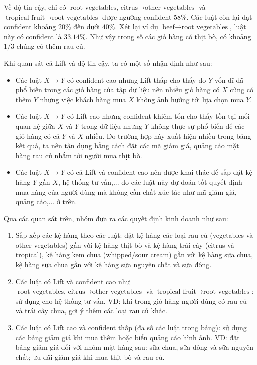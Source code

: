\documentclass[conference]{IEEEtran}
\begin{document}
Về độ tin cậy, chỉ có $\text{root vegetables, citrus} \rightarrow \text{other vegetables}$ và $\text{tropical fruit} \rightarrow \text{root vegetables}$ được ngưỡng confident $58\%$. Các luật còn lại đạt confident khoảng $20\%$ đến dưới $40\%$. Xét lại ví dụ $\text{beef} \rightarrow \text{root vegetables}$, luật này có confident là $33.14\%$. Như vậy trong số các giỏ hàng có thịt bò, có khoảng $1/3$ chúng có thêm rau củ.

Khi quan sát cả Lift và độ tin cậy, ta có một số nhận định như sau:
\begin{itemize}
    \item Các luật $X \rightarrow Y$ có confident cao nhưng Lift thấp cho thấy do $Y$ vốn dĩ đã phổ biến trong các giỏ hàng của tập dữ liệu nên nhiều giỏ hàng có $X$ cũng có thêm $Y$ nhưng việc khách hàng mua $X$ không ảnh hưởng tới lựa chọn mua $Y$.
    \item Các luật $X \rightarrow Y$ có Lift cao nhưng confident khiêm tốn cho thấy tồn tại mối quan hệ giữa $X$ và $Y$ trong dữ liệu nhưng $Y$ không thực sự phổ biến để các giỏ hàng có cả $Y$ và $X$ nhiều. Do trường hợp này xuất hiện nhiều trong bảng kết quả, ta nên tận dụng bằng cách đặt các mã giảm giá, quảng cáo mặt hàng rau củ nhắm tới người mua thịt bò.
    \item Các luật $X \rightarrow Y$ có cả Lift và confident cao nên được khai thác để sắp đặt kệ hàng $Y$ gần $X$, hệ thống tư vấn,... do các luật này dự đoán tốt quyết định mua hàng của người dùng mà không cần chất xúc tác như mã giảm giá, quảng cáo,... ở trên.
\end{itemize}

Qua các quan sát trên, nhóm đưa ra các quyết định kinh doanh như sau:
\begin{enumerate}
    \item Sắp xếp các kệ hàng theo các luật: đặt kệ hàng các loại rau củ (vegetables và other vegetables) gần với kệ hàng thịt bò và kệ hàng trái cây (citrus và tropical), kệ hàng kem chua (whipped/sour cream) gần với kệ hàng sữa chua, kệ hàng sữa chua gần với kệ hàng sữa nguyên chất và sữa đông.
    \item Các luật có Lift và confident cao như $\text{root vegetables, citrus} \rightarrow \text{other vegetables}$ và $\text{tropical fruit} \rightarrow \text{root vegetables}$: sử dụng cho hệ thống tư vấn. VD: khi trong giỏ hàng người dùng có rau củ và trái cây chua, gợi ý thêm các loại rau củ khác.
    \item Các luật có Lift cao và confident thấp (đa số các luật trong bảng): sử dụng các bảng giảm giá khi mua thêm hoặc biển quảng cáo hình ảnh. VD: đặt bảng giảm giá đối với nhóm mặt hàng sau: sữa chua, sữa đông và sữa nguyên chất; ưu đãi giảm giá khi mua thịt bò và rau củ.
\end{enumerate}
\end{document}
